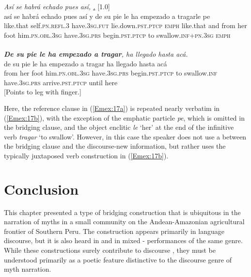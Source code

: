 \documentclass[output=paper]{LSP/langsci}
\begin{document}
\begin{exe}
\ex \label{Em17ab}
\begin{xlist}
\ex \label{Emex:17a}
\glt \textit{Así se habrá echado pues así,  \underline{.}} [1.0]\\
\gll así se habrá echado pues así y de su pie le ha empezado a tragarle pe \\
 like.that self\textsc{.pn.refl.3} have\textsc{.3sg.fut} lie.down\textsc{.pst.ptcp} \textsc{emph} like.that and from her foot him\textsc{.pn.obl.3sg} have\textsc{.3sg.prs} begin\textsc{.pst.ptcp} to swallow\textsc{.inf+pn.3sg} \textsc{emph}\\
\glt {}\\
\ex \label{Emex:17b}
\glt \textit{\textbf{De su pie le ha empezado a tragar}, ha llegado hasta acá.}\\
\gll de su pie le ha empezado a tragar ha llegado hasta acá\\     	      
    from her foot him\textsc{.pn.obl.3sg} have\textsc{.3sg.prs} begin\textsc{.pst.ptcp} to swallow\textsc{.inf} have\textsc{.3sg.prs} arrive\textsc{.pst.ptcp} until here\\
\glt {} [Points to leg with finger.] 
\end{xlist}
\end{exe}


Here, the reference clause in (\ref{Emex:17a}) is repeated nearly verbatim in (\ref{Emex:17b}), with the exception of the emphatic particle \textit{pe}, which is omitted in the bridging clause, and the object enclitic \textit{le} `her' at the end of the infinitive verb \textit{tragar} `to swallow'. However, in this case the speaker does not use a  between the bridging clause and the discourse-new information, but rather uses the typically  juxtaposed verb construction in (\ref{Emex:17b}).
%

\section{ Conclusion}
\label{Emconclus}
This chapter presented a type of bridging construction that is ubiquitous in the narration of  myths in a small community on the Andean-Amazonian agricultural frontier of Southern Peru. The construction appears primarily in  language discourse, but it is also heard in  and in mixed - performances of the same genre. While these constructions surely contribute to discourse , they must be understood primarily as a poetic feature distinctive to the discourse genre of myth narration.
\end{document}
